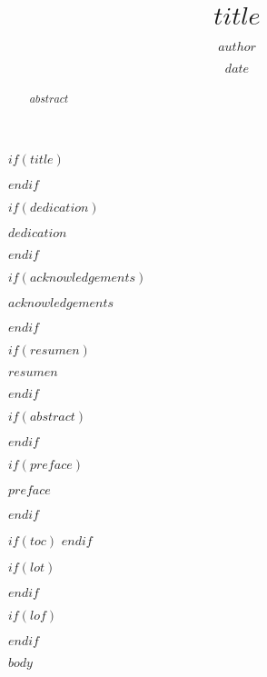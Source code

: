 \documentclass[12pt,oneside]{reedthesis}
\title{$title$}
\author{$author$}
\date{$date$}
\begin{document}
$if(title)$
  \maketitle
$endif$



\frontmatter %
\pagestyle{empty} %

$if(dedication)$
  \begin{dedication}
    $dedication$
  \end{dedication}
$endif$

$if(acknowledgements)$
  \begin{acknowledgements}
    $acknowledgements$
  \end{acknowledgements}
$endif$

$if(resumen)$
  \begin{resumen}
    $resumen$
  \end{resumen}
$endif$

$if(abstract)$
  \begin{abstract}
    $abstract$
  \end{abstract}
$endif$

$if(preface)$
  \begin{preface}
    $preface$
  \end{preface}
$endif$

$if(toc)$
  \hypersetup{linkcolor=$if(toccolor)$$toccolor$$else$black$endif$}
  \setcounter{tocdepth}{$toc-depth$}
  \tableofcontents
$endif$

$if(lot)$
  \listoftables
$endif$

$if(lof)$
  \listoffigures
$endif$

\mainmatter %
\pagestyle{fancyplain} %

$body$


\end{document}
